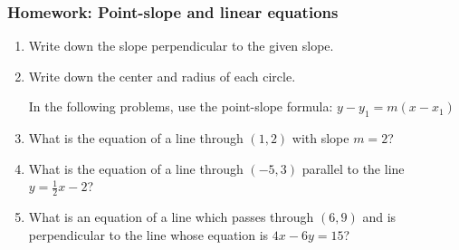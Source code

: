 \documentclass[12pt, twoside]{article}
\begin{document}
\subsubsection*{Homework: Point-slope and linear equations}
  \begin{enumerate}

  \item Write down the slope perpendicular to the given slope. \vspace{0.5cm}
    \begin{enumerate}
    \end{enumerate}

  \item Write down the center and radius of each circle.
    \begin{enumerate}
    \end{enumerate}  \vspace{2cm}

  In the following problems, use the point-slope formula: $y-y_1=m (x-x_1)$
    \item What is the equation of a line through $(1,2)$ with slope $m=2$?  \vspace{2cm}
    \item What is the equation of a line through $(-5,3)$ parallel to the line $y=\frac{1}{2}x-2$?  \vspace{2cm}

    \item What is an equation of a line which passes through $(6,9)$ and is perpendicular to the line whose equation is $4x-6y=15$? \vspace{1cm}



\end{enumerate}
\end{document}
